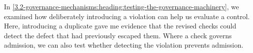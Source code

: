 In \autoref{3.2-governance-mechanisms:heading:testing-the-governance-machinery}, we examined how deliberately introducing a violation can help us evaluate a control. Here, introducing a duplicate gave me evidence that the revised checks could detect the defect that had previously escaped them. Where a check governs admission, we can also test whether detecting the violation prevents admission.

